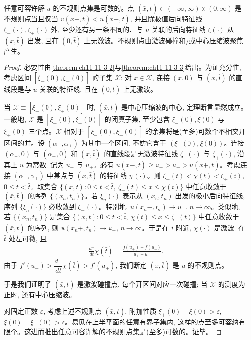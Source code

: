 \documentclass[../../main.tex]{subfiles}
\begin{document}
\begin{theorem}\label{theorem:ch11-11-3-4}
任意可容许解 $u$ 的不规则点集是可数的。点 $(\bar x,\bar t)\in(-\infty,\infty)\times(0,\infty)$ 是不规则点当且仅当 $u(\bar x+,\bar t)<u(\bar x-,\bar t)$, 并且除极值后向特征线 $\xi_-(\cdot),\xi_+(\cdot)$ 外, 至少还有另一条不同的、与 $u$ 关联的后向特征线 $\xi(\cdot)$ 从 $(\bar x,\bar t)$ 出发, 且在 $(0,\bar t)$ 上无激波。不规则点由激波碰撞和/或中心压缩波聚焦产生。
\end{theorem}

\begin{proof}
必要性由\cref{theorem:ch11-11-3-2}与\cref{theorem:ch11-11-3-3}给出。为证充分性, 考虑区间 $[\xi_-(0),\xi_+(0)]$ 的子集 $\mathscr{X}$: 对 $x\in\mathscr{X}$, 连接 $(x,0)$ 与 $(\bar x,\bar t)$ 的直线段是与 $u$ 关联的特征线, 且在 $(0,\bar t)$ 上无激波。

当 $\mathscr{X}\equiv[\xi_-(0),\xi_+(0)]$ 时, $(\bar x,\bar t)$ 是中心压缩波的中心, 定理断言显然成立。一般地, $\mathscr{X}$ 是 $[\xi_-(0),\xi_+(0)]$ 的闭真子集, 至少包含 $\xi_-(0),\xi(0)$ 与 $\xi_+(0)$ 三个点。$\mathscr{X}$ 相对于 $[\xi_-(0),\xi_+(0)]$ 的余集将是(至多)可数个不相交开区间的并。设 $(\alpha_-,\alpha_+)$ 为其中一个区间, 不妨它含于 $(\xi_-(0),\xi(0))$。连接 $(\alpha_-,0)$ 与 $(\alpha_+,0)$ 和 $(\bar x,\bar t)$ 的直线段是无激波特征线 $\zeta_-(\cdot)$ 与 $\zeta_+(\cdot)$, 沿其上 $u$ 为常数, 记为 $u_-$ 与 $u_+$。必有 $u(\bar x-,\bar t)\geqslant u_->u_+>u(\bar x+,\bar t)$。考虑连接 $(\alpha_-,\alpha_+)$ 中某点与 $(\bar x,\bar t)$ 的特征线 $\chi(\cdot)$。则 $\zeta_-(t)<\chi(t)<\zeta_+(t)$, $0\leqslant t<\bar t$。取集合 $\{(x,t):0\leqslant t<\bar t,\ \zeta_-(t)\leqslant x\leqslant\chi(t)\}$ 中任意收敛于 $(\bar x,\bar t)$ 的序列 $\{(x_n,t_n)\}$。若 $\xi_n(\cdot)$ 表示从 $(x_n,t_n)$ 出发的极小后向特征线, 序列 $\{\xi_n(\cdot)\}$ 必收敛到 $\zeta_-(\cdot)$。特别地, $u(x_n-,t_n)\to u_-$, $n\to\infty$。类似地, 若 $\{(x_n,t_n)\}$ 是集合 $\{(x,t):0\leqslant t<\bar t,\ \chi(t)\leqslant x\leqslant\zeta_+(t)\}$ 中任意收敛于 $(\bar x,\bar t)$ 的序列, 则 $u(x_n+,t_n)\to u_+$, $n\to\infty$。于是在 $\bar t$ 附近, $\chi(\cdot)$ 是激波, 在 $\bar t$ 处左可微, 且
\begin{align}
\frac{d^-}{dt}\chi(\bar t)=\frac{f(u_+)-f(u_-)}{u_+-u_-}.\label{align:ch11-11-3-4}
\end{align}
由于 $f'(u_-)>\dfrac{d^-}{dt}\chi(\bar t)>f'(u_+)$, 我们断定 $(\bar x,\bar t)$ 是 $u$ 的不规则点。

于是我们证明了 $(\bar x,\bar t)$ 是激波碰撞点, 每个开区间对应一次碰撞; 当 $\mathscr{X}$ 的测度为正时, 还有中心压缩波。

对固定正数 $\varepsilon$, 考虑上述不规则点 $(\bar x,\bar t)$, 附加性质 $\xi_+(0)-\xi(0)>\varepsilon$, $\xi(0)-\xi_-(0)>\varepsilon$。易见在上半平面的任意有界子集内, 这样的点至多可容纳有限个。这进而推出任意可容许解的不规则点集是(至多)可数的。证毕。
\end{proof}
\end{document}
